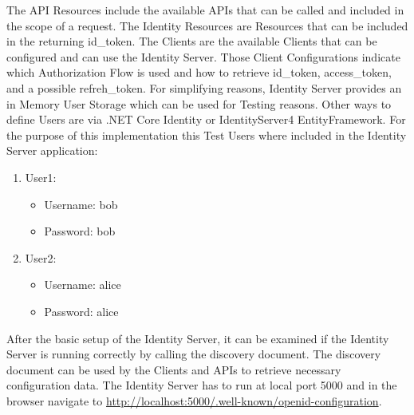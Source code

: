 The API Resources include the available APIs that can be called and included in the scope of a request. The Identity Resources are Resources that can be included in the returning id\_token. The Clients are the available Clients that can be configured and can use the Identity Server. Those Client Configurations indicate which Authorization Flow is used and how to retrieve id\_token, access\_token, and a possible refreh\_token. For simplifying reasons, Identity Server provides an in Memory User Storage which can be used for Testing reasons. Other ways to define Users are via .NET Core Identity or IdentityServer4 EntityFramework. For the purpose of this implementation this Test Users where included in the Identity Server application:
\begin{enumerate}
	\item User1:
	\begin{itemize}
		\item  Username: bob
		\item  Password: bob
	\end{itemize} 
	\item User2:
	\begin{itemize}
		\item  Username: alice
		\item  Password: alice
	\end{itemize} 
\end{enumerate}

After the basic setup of the Identity Server, it can be examined if the Identity Server is running correctly by calling the discovery document. The discovery document can be used by the Clients and APIs to retrieve necessary configuration data. The Identity Server has to run at local port 5000 and in the browser navigate to
\url{http://localhost:5000/.well-known/openid-configuration}.

